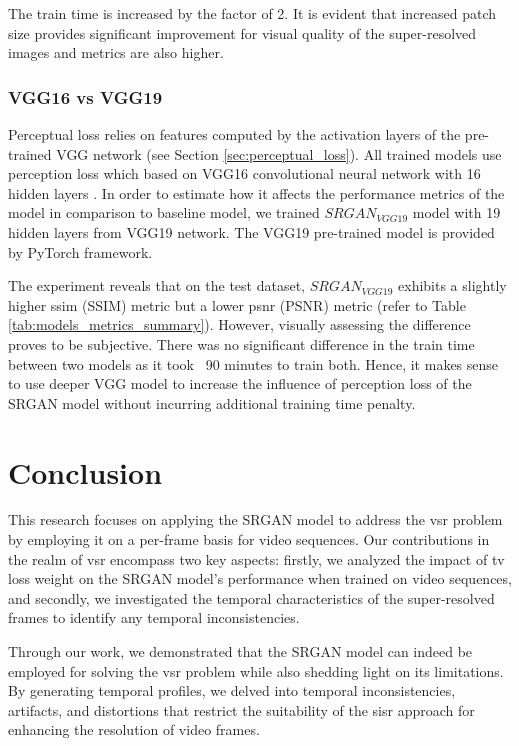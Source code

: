 \documentclass[conference]{IEEEtran}
\begin{document}
The train time is increased by the factor of 2. It is evident that increased patch size provides significant improvement for visual quality of the super-resolved images and metrics are also higher.

\subsubsection{VGG16 vs VGG19}

Perceptual loss relies on features computed by the activation layers of the pre-trained VGG network (see Section \ref{sec:perceptual_loss}). All trained models use perception loss which based on VGG16 convolutional neural network with 16 hidden layers \cite{vgg_very_deep_cnn_2014}. In order to estimate how it affects the performance metrics of the model in comparison to baseline model, we trained $SRGAN_{VGG19}$ model with 19 hidden layers from VGG19 network. The VGG19 pre-trained model is provided by PyTorch framework.

The experiment reveals that on the test dataset, $SRGAN_{VGG19}$ exhibits a slightly higher \acrlong{ssim} (SSIM) metric but a lower \acrlong{psnr} (PSNR) metric (refer to Table \ref{tab:models_metrics_summary}). However, visually assessing the difference proves to be subjective. There was no significant difference in the train time between two models as it took ~90 minutes to train both. Hence, it makes sense to use deeper VGG model to increase the influence of perception loss of the SRGAN model without incurring additional training time penalty.

\section{Conclusion}

This research focuses on applying the SRGAN model to address the \acrlong{vsr} problem by employing it on a per-frame basis for video sequences. Our contributions in the realm of \acrlong{vsr} encompass two key aspects: firstly, we analyzed the impact of \acrlong{tv} loss weight on the SRGAN model's performance when trained on video sequences, and secondly, we investigated the temporal characteristics of the super-resolved frames to identify any temporal inconsistencies.

Through our work, we demonstrated that the SRGAN model can indeed be employed for solving the \acrlong{vsr} problem while also shedding light on its limitations. By generating temporal profiles, we delved into temporal inconsistencies, artifacts, and distortions that restrict the suitability of the \acrlong{sisr} approach for enhancing the resolution of video frames.
\end{document}
